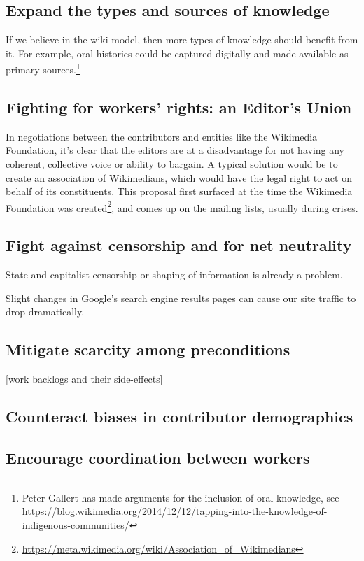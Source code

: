 \subsection{Expand the types and sources of knowledge}

If we believe in the wiki model, then more types of knowledge should benefit from it.  For example, oral histories could be captured digitally and made available as primary sources.\footnote{Peter Gallert has made arguments for the inclusion of oral knowledge, see \url{https://blog.wikimedia.org/2014/12/12/tapping-into-the-knowledge-of-indigenous-communities/}}

\subsection{Fighting for workers' rights: an Editor's Union}

In negotiations between the contributors and entities like the Wikimedia Foundation, it's clear that the editors are at a disadvantage for not having any coherent, collective voice or ability to bargain.  A typical solution would be to create an association of Wikimedians, which would have the legal right to act on behalf of its constituents.  This proposal first surfaced at the time the Wikimedia Foundation was created\footnote{\url{https://meta.wikimedia.org/wiki/Association_of_Wikimedians}}, and comes up on the mailing lists, usually during crises.

\subsection{Fight against censorship and for net neutrality}

State and capitalist censorship or shaping of information is already a problem.

Slight changes in Google's search engine results pages can cause our site traffic to drop dramatically.

\subsection{Mitigate scarcity among preconditions}

[work backlogs and their side-effects]

\subsection{Counteract biases in contributor demographics}

\subsection{Encourage coordination between workers}

